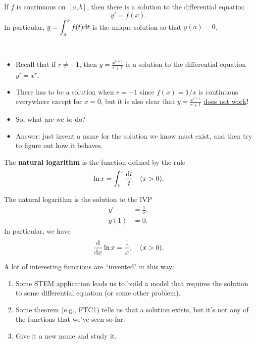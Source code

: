 

\begin{theorem}
If $f$ is continuous on $[a,b]$, then there is a solution to the differential equation
\begin{equation*}
y'=f(x).
\end{equation*}
In particular, $y=\displaystyle\int_a^xf(t)\mathrm{d} t$ is the unique solution so that $y(a)=0$.
\end{theorem}

\begin{remark}\,
\begin{itemize}
\item Recall that if $r\ne -1$, then $y= \frac{x^{r+1}}{r+1}$ is a solution to the differential equation $y'=x^r$.
\item There has to be a solution when $r=-1$ since $f(x)=1/x$ is continuous everywhere except for $x=0$, but it is also clear that $y=\frac{x^{r+1}}{r+1}$ \underline{does not work}!
\item So, what are we to do?
\item Answer: just invent a name for the solution we know must exist, and then try to figure out how it behaves.
\end{itemize}
\end{remark}

\begin{definition}
The \textbf{natural logarithm} is the function defined by the rule
\begin{equation*}
\ln x = \int_1^x\frac{\mathrm{d} t}{t}\quad (x>0).
\end{equation*}
\end{definition}

\begin{corollary}
The natural logarithm is the solution to the IVP
\begin{align*}
y' & = \frac{1}{x},\\
y(1) &=0.
\end{align*}
In particular, we have
\begin{equation*}
\frac{\mathrm{d}}{\mathrm{d} x}\ln x = \frac{1}{x},\quad (x>0).
\end{equation*}
\end{corollary}

\begin{remark}
A lot of interesting functions are ``invented" in this way:
\begin{enumerate}
\item Some STEM application leads us to build a model that requires the solution to some differential equation (or some other problem).
\item Some theorem (e.g., FTC1) tells us that a solution exists, but it's not any of the functions that we've seen so far.
\item Give it a new name and study it.
\end{enumerate}
\end{remark}

